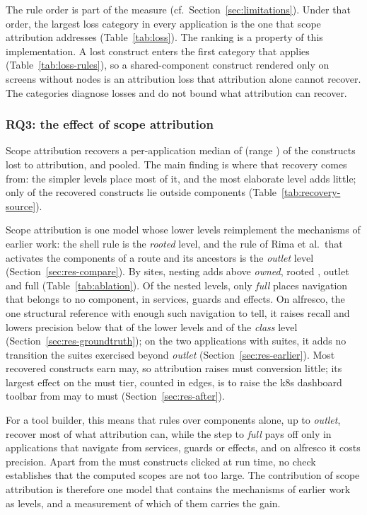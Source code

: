 The rule order is part of the measure (cf.~Section~\ref{sec:limitations}). Under that order, the
largest loss category in every application is the one that scope attribution addresses
(Table~\ref{tab:loss}). The ranking is a property of this implementation. A lost
construct enters the first category that applies (Table~\ref{tab:loss-rules}), so a
shared-component construct rendered only on screens without nodes is an attribution loss that
attribution alone cannot recover. The categories diagnose losses and do not bound what attribution
can recover.

\subsubsection{RQ3: the effect of scope attribution}
\label{sec:rq3}

Scope attribution recovers a per-application median of \AttrRecoveredMedian{} (range
\AttrRecoveredRange{}) of the constructs lost to attribution, and \AttrRecoveredShare{} pooled. The
main finding is where that recovery comes from: the simpler levels place most of it, and the most
elaborate level adds little; only \AttrServiceRecovered{} of the \AttrRecovered{} recovered
constructs lie outside components (Table~\ref{tab:recovery-source}).

Scope attribution is one model whose lower levels reimplement the mechanisms of earlier work: the
shell rule is the \emph{rooted} level, and the rule of Rima et al.\ that activates the
components of a route and its ancestors is the \emph{outlet} level (Section~\ref{sec:res-compare}).
By sites, nesting adds \AblationNestingAddedSites{} above \emph{owned}, rooted
\AblationRootedAddedSites{}, outlet \AblationOutletAddedSites{} and full \AblationFullAddedSites{}
(Table~\ref{tab:ablation}). Of the nested levels, only \emph{full} places navigation that belongs to no
component, in services, guards and effects. On alfresco, the one structural reference with enough
such navigation to tell, it raises recall and lowers precision below that of the lower levels and
of the \emph{class} level (Section~\ref{sec:res-groundtruth}); on the two applications with suites,
it adds no transition the suites exercised beyond \emph{outlet} (Section~\ref{sec:res-earlier}).
Most recovered constructs earn may, so attribution raises must conversion little; its largest
effect on the must tier, counted in edges, is to raise the k8s dashboard toolbar from may to must
(Section~\ref{sec:res-after}).

For a tool builder, this means that rules over components alone, up to \emph{outlet}, recover
most of what attribution can, while the step to \emph{full} pays off only in applications that
navigate from services, guards or effects, and on alfresco it costs precision. Apart from the
must constructs clicked at run time, no check establishes that the computed scopes are not too
large. The contribution of scope attribution is therefore one model that contains the mechanisms of
earlier work as levels, and a measurement of which of them carries the gain.

